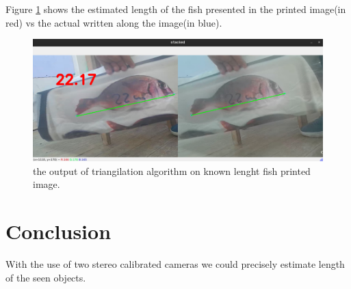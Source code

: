 \documentclass[journal]{IEEEtran}
\begin{document}
 	Figure \ref{fig:the actual length of the object in printed image vs the estimated} shows the estimated length of the fish presented in the printed image(in red) vs the actual written along the image(in blue).
	 \begin{figure}[h]
	 	\centering
	 	\includegraphics[width=\linewidth]{Output of the algorithm.png}
	 	\caption{the output of triangilation algorithm on known lenght fish printed image.}
	 	\label{fig:the actual length of the object in printed image vs the estimated}
	 \end{figure}
	 

	\section{Conclusion}
	 With the use of two stereo calibrated cameras we could precisely estimate length of the seen objects.  

	
	\ifCLASSOPTIONcaptionsoff
	\newpage
	\fi
		
	
	
\end{document}

